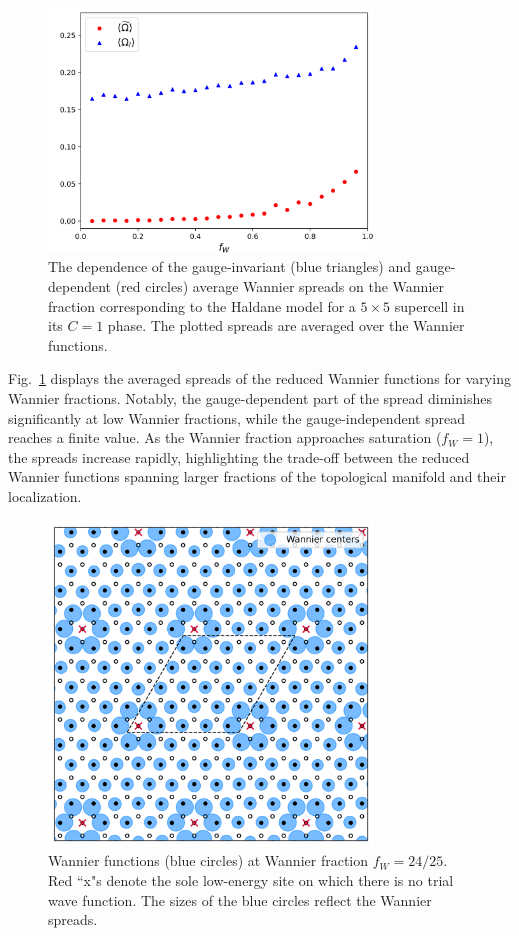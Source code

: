 \documentclass[galley,aps,pra,10pt,amsmath,amssymb,
    superscriptaddress,nofootinbib,longbibliography]{revtex4-2}
\begin{document}
\begin{figure}[t]
\begin{center}
\includegraphics[width=3.4in]{fig8.png}
\end{center}
\vspace{-5mm}
\caption{The dependence of the gauge-invariant (blue triangles) and gauge-dependent (red circles) average Wannier spreads on the Wannier fraction corresponding to the Haldane model for a $5\times 5$ supercell in its $C=1$ phase. The plotted spreads are averaged over the Wannier functions.}
\label{FIG8}
\end{figure}

Fig.~\ref{FIG8} displays the averaged spreads of the reduced Wannier functions for varying Wannier fractions. Notably, the gauge-dependent part of the spread diminishes significantly at low Wannier fractions, while the gauge-independent spread reaches a finite value. As the Wannier fraction approaches saturation ($f_W=1$), the spreads increase rapidly, highlighting the trade-off between the reduced Wannier functions spanning larger fractions of the topological manifold and their localization.

\begin{figure}[t]
\begin{center}
\includegraphics[width=3.4in]{fig9.png}
\end{center}
\vspace{-5mm}
\caption{Wannier functions (blue circles) at Wannier fraction $f_W = 24/25$. Red ``x"s denote the sole low-energy site on which there is no trial wave function. The sizes of the blue circles reflect the Wannier spreads.}
\label{FIG9}
\end{figure}
\end{document}
